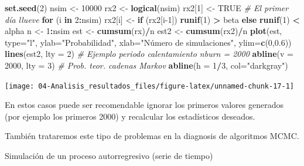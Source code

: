 \documentclass[
]{book}
\newenvironment{Shaded}{\begin{snugshade}}{\end{snugshade}}
\newcommand{\CommentTok}[1]{\textcolor[rgb]{0.56,0.35,0.01}{\textit{#1}}}
\newcommand{\ControlFlowTok}[1]{\textcolor[rgb]{0.13,0.29,0.53}{\textbf{#1}}}
\newcommand{\DataTypeTok}[1]{\textcolor[rgb]{0.13,0.29,0.53}{#1}}
\newcommand{\DecValTok}[1]{\textcolor[rgb]{0.00,0.00,0.81}{#1}}
\newcommand{\FloatTok}[1]{\textcolor[rgb]{0.00,0.00,0.81}{#1}}
\newcommand{\KeywordTok}[1]{\textcolor[rgb]{0.13,0.29,0.53}{\textbf{#1}}}
\newcommand{\NormalTok}[1]{#1}
\newcommand{\OperatorTok}[1]{\textcolor[rgb]{0.81,0.36,0.00}{\textbf{#1}}}
\newcommand{\OtherTok}[1]{\textcolor[rgb]{0.56,0.35,0.01}{#1}}
\newcommand{\StringTok}[1]{\textcolor[rgb]{0.31,0.60,0.02}{#1}}
\theoremstyle{break}
\theoremstyle{definition}
\theoremstyle{definition}
\theoremstyle{definition}
\theoremstyle{remark}
\let\BeginKnitrBlock\begin \let\EndKnitrBlock\end
\begin{document}
\begin{Shaded}
\begin{Highlighting}[]
\KeywordTok{set.seed}\NormalTok{(}\DecValTok{2}\NormalTok{)}
\NormalTok{nsim <-}\StringTok{ }\DecValTok{10000}
\NormalTok{rx2 <-}\StringTok{ }\KeywordTok{logical}\NormalTok{(nsim)}
\NormalTok{rx2[}\DecValTok{1}\NormalTok{] <-}\StringTok{ }\OtherTok{TRUE} \CommentTok{# El primer día llueve}
\ControlFlowTok{for}\NormalTok{ (i }\ControlFlowTok{in} \DecValTok{2}\OperatorTok{:}\NormalTok{nsim)}
\NormalTok{  rx2[i] <-}\StringTok{ }\ControlFlowTok{if}\NormalTok{ (rx2[i}\DecValTok{-1}\NormalTok{]) }\KeywordTok{runif}\NormalTok{(}\DecValTok{1}\NormalTok{) }\OperatorTok{>}\StringTok{ }\NormalTok{beta }\ControlFlowTok{else} \KeywordTok{runif}\NormalTok{(}\DecValTok{1}\NormalTok{) }\OperatorTok{<}\StringTok{ }\NormalTok{alpha}
\NormalTok{n <-}\StringTok{ }\DecValTok{1}\OperatorTok{:}\NormalTok{nsim}
\NormalTok{est <-}\StringTok{ }\KeywordTok{cumsum}\NormalTok{(rx)}\OperatorTok{/}\NormalTok{n}
\NormalTok{est2 <-}\StringTok{ }\KeywordTok{cumsum}\NormalTok{(rx2)}\OperatorTok{/}\NormalTok{n}
\KeywordTok{plot}\NormalTok{(est, }\DataTypeTok{type=}\StringTok{"l"}\NormalTok{, }\DataTypeTok{ylab=}\StringTok{"Probabilidad"}\NormalTok{, }
     \DataTypeTok{xlab=}\StringTok{"Número de simulaciones"}\NormalTok{, }\DataTypeTok{ylim=}\KeywordTok{c}\NormalTok{(}\DecValTok{0}\NormalTok{,}\FloatTok{0.6}\NormalTok{))}
\KeywordTok{lines}\NormalTok{(est2, }\DataTypeTok{lty =} \DecValTok{2}\NormalTok{)}
\CommentTok{# Ejemplo periodo calentamiento nburn = 2000}
\KeywordTok{abline}\NormalTok{(}\DataTypeTok{v =} \DecValTok{2000}\NormalTok{, }\DataTypeTok{lty =} \DecValTok{3}\NormalTok{)}
\CommentTok{# Prob. teor. cadenas Markov}
\KeywordTok{abline}\NormalTok{(}\DataTypeTok{h =} \DecValTok{1}\OperatorTok{/}\DecValTok{3}\NormalTok{, }\DataTypeTok{col=}\StringTok{"darkgray"}\NormalTok{)     }
\end{Highlighting}
\end{Shaded}

\begin{center}\texttt{[image: 04-Analisis\_resultados\_files/figure-latex/unnamed-chunk-17-1]} \end{center}

En estos casos puede ser recomendable ignorar los primeros valores generados (por ejemplo los primeros 2000) y recalcular los
estadísticos deseados.

También trataremos este tipo de problemas en la diagnosis de algoritmos MCMC.

\BeginKnitrBlock{example}
\protect\hypertarget{exm:unnamed-chunk-18}{}{\label{exm:unnamed-chunk-18} }Simulación de un proceso autorregresivo (serie de tiempo)
\EndKnitrBlock{example}
\end{document}
